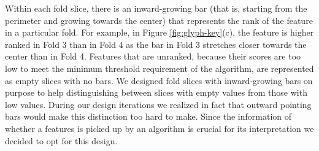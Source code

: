 Within each fold slice, there is an inward-growing bar (that is, starting from the perimeter and growing towards the center) that represents the rank of the feature in a particular fold. For example, in Figure \ref{fig:glyph-key}(c), the feature is higher ranked in Fold 3 than in Fold 4 as the bar in Fold 3 stretches closer towards the center than in Fold 4. Features that are unranked, because their scores are too low to meet the minimum threshold requirement of the algorithm, are represented as empty slices with no bars. We designed fold slices with inward-growing bars on purpose to help distinguishing between slices with empty values from those with low values. During our design iterations we realized in fact that outward pointing bars would make this distinction too hard to make. Since the information of whether a features is picked up by an algorithm is crucial for its interpretation we decided to opt for this design.






